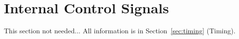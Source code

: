 \section{Internal Control Signals}
\label{sec:control}

This section not needed... All information is in Section~\ref{sec:timing} (Timing).
